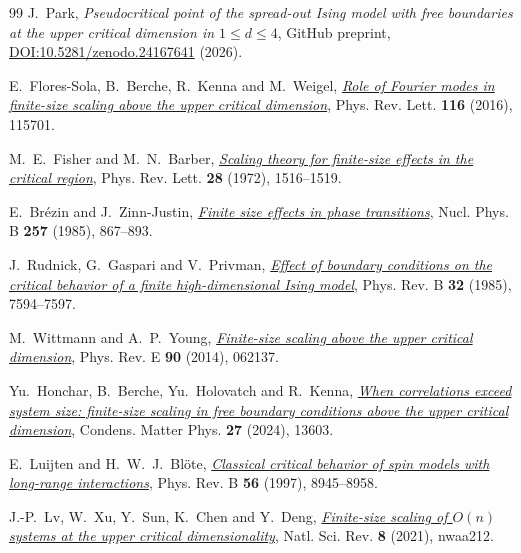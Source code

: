 \documentclass[11pt]{article}
\numberwithin{equation}{section}
\begin{document}
\begin{thebibliography}{99}
J.~Park, \emph{Pseudocritical point of the spread-out Ising model with free
boundaries at the upper critical dimension in $1\le d\le4$},
GitHub preprint,
\href{https://github.com/jiwoonGit/phi4/blob/main/FSS/FSS_FBC-dim-extension.pdf}{DOI:10.5281/zenodo.24167641} (2026).

E.~Flores-Sola, B.~Berche, R.~Kenna and M.~Weigel,
\href{https://doi.org/10.1103/PhysRevLett.116.115701}
{\emph{Role of Fourier modes in finite-size scaling above the upper
critical dimension}}, Phys. Rev. Lett. \textbf{116} (2016), 115701.

M.~E.~Fisher and M.~N.~Barber,
\href{https://doi.org/10.1103/PhysRevLett.28.1516}
{\emph{Scaling theory for finite-size effects in the critical region}},
Phys. Rev. Lett. \textbf{28} (1972), 1516--1519.

E.~Br\'ezin and J.~Zinn-Justin,
\href{https://doi.org/10.1016/0550-3213(85)90379-7}
{\emph{Finite size effects in phase transitions}},
Nucl. Phys. B \textbf{257} (1985), 867--893.

J.~Rudnick, G.~Gaspari and V.~Privman,
\href{https://doi.org/10.1103/PhysRevB.32.7594}
{\emph{Effect of boundary conditions on the critical behavior of a
finite high-dimensional Ising model}}, Phys. Rev. B \textbf{32}
(1985), 7594--7597.

M.~Wittmann and A.~P.~Young,
\href{https://doi.org/10.1103/PhysRevE.90.062137}
{\emph{Finite-size scaling above the upper critical dimension}},
Phys. Rev. E \textbf{90} (2014), 062137.

Yu.~Honchar, B.~Berche, Yu.~Holovatch and R.~Kenna,
\href{https://doi.org/10.5488/CMP.27.13603}
{\emph{When correlations exceed system size: finite-size scaling in
free boundary conditions above the upper critical dimension}},
Condens. Matter Phys. \textbf{27} (2024), 13603.

E.~Luijten and H.~W.~J.~Bl\"ote,
\href{https://doi.org/10.1103/PhysRevB.56.8945}
{\emph{Classical critical behavior of spin models with long-range
interactions}}, Phys. Rev. B \textbf{56} (1997), 8945--8958.

J.-P.~Lv, W.~Xu, Y.~Sun, K.~Chen and Y.~Deng,
\href{https://doi.org/10.1093/nsr/nwaa212}
{\emph{Finite-size scaling of $O(n)$ systems at the upper critical
dimensionality}}, Natl. Sci. Rev. \textbf{8} (2021), nwaa212.


\end{thebibliography}
\end{document}
